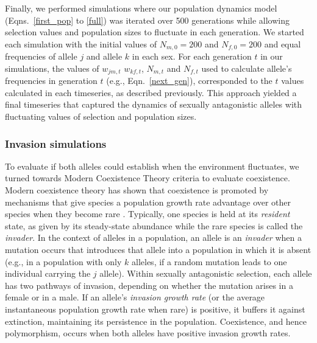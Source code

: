 \documentclass[12pt]{article}
\begin{document}


Finally, we performed simulations where our population dynamics model (Eqns.~\ref{first_pop} to \ref{full}) was iterated over 500 generations while allowing selection values and population sizes to fluctuate in each generation. We started each simulation with the initial values of $N_{m,0}=200$ and $N_{f,0}=200$ and equal frequencies of allele $j$ and allele $k$ in each sex. For each generation $t$ in our simulations, the values of $w_{jm,t}$ $w_{kf,t}$, $N_{m,t}$ and $N_{f,t}$ used to calculate allele's frequencies in generation $t$ (e.g., Eqn.~\ref{next_gen}), corresponded to the $t$ values calculated in each timeseries, as described previously. This approach yielded a final timeseries that captured the dynamics of sexually antagonistic alleles with fluctuating values of selection and population sizes.

\subsubsection*{Invasion simulations}

 To evaluate if both alleles could establish when the environment fluctuates, we turned towards Modern Coexistence Theory criteria to evaluate coexistence. Modern coexistence theory has shown that coexistence is promoted by mechanisms that give species a population growth rate advantage over other species when they become rare \citep{chesson_stabilizing_1982, chesson2003quantifying, barabas_chessons_2018}. Typically, one species is held at its \textit{resident} state, as given by its steady-state abundance while the rare species is called the \textit{invader}. In the context of alleles in a population, an allele is an \textit{invader} when a mutation occurs that introduces that allele into a population in which it is absent (e.g., in a population with only $k$ alleles, if a random mutation leads to one individual carrying the $j$ allele). Within sexually antagonistic selection, each allele has two pathways of invasion, depending on whether the mutation arises in a female or in a male. If an allele's \textit{invasion growth rate} (or the average instantaneous population growth rate when rare) is positive, it buffers it against extinction, maintaining its persistence in the population.  Coexistence, and hence polymorphism, occurs when both alleles have positive invasion growth rates.
\end{document}
